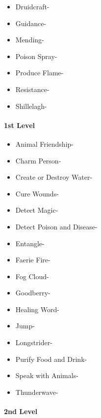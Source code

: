 \documentclass[
]{article}
\providecommand{\tightlist}{%
  \setlength{\itemsep}{0pt}\setlength{\parskip}{0pt}}
\begin{document}
\begin{itemize}
\tightlist
\item
  Druidcraft-
\item
  Guidance-
\item
  Mending-
\item
  Poison Spray-
\item
  Produce Flame-
\item
  Resistance-
\item
  Shillelagh-
\end{itemize}

\hypertarget{1st-level-2}{%
\paragraph{1st Level}\label{1st-level-2}}

\begin{itemize}
\tightlist
\item
  Animal Friendship-
\item
  Charm Person-
\item
  Create or Destroy Water-
\item
  Cure Wounds-
\item
  Detect Magic-
\item
  Detect Poison and Disease-
\item
  Entangle-
\item
  Faerie Fire-
\item
  Fog Cloud-
\item
  Goodberry-
\item
  Healing Word-
\item
  Jump-
\item
  Longstrider-
\item
  Purify Food and Drink-
\item
  Speak with Animals-
\item
  Thunderwave-
\end{itemize}

\hypertarget{2nd-level-2}{%
\paragraph{2nd Level}\label{2nd-level-2}}
\end{document}
